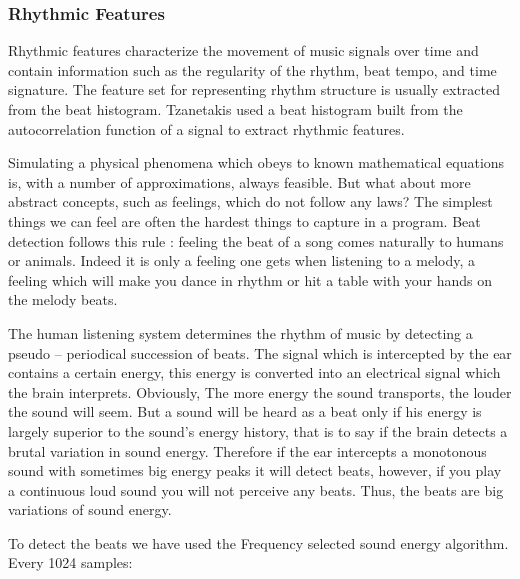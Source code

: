 \subsubsection{Rhythmic Features}
Rhythmic features characterize the movement of music signals over time and contain information such as the regularity of the rhythm, beat tempo, and time signature. The
feature set for representing rhythm structure is usually extracted from the beat histogram. Tzanetakis \cite{Tzanetakis2002} used a beat histogram built from the autocorrelation
function of a signal to extract rhythmic features.
\par Simulating a physical phenomena which obeys to known mathematical equations is, with a number of approximations, always feasible. But what about
more abstract concepts, such as feelings, which do not follow any laws? The simplest things we can feel are often the hardest things to capture in a
program. Beat detection follows this rule : feeling the beat of a song comes naturally to humans or animals. Indeed it is only a feeling one gets when
listening to a melody, a feeling which will make you dance in rhythm or hit a table with your hands on the melody beats. 
\par The human listening system determines the rhythm of music by detecting a pseudo – periodical succession of beats. The
signal which is intercepted by the ear contains a certain energy, this energy is converted into an electrical signal which the brain interprets.
Obviously, The more energy the sound transports, the louder the sound will seem. But a sound will be heard as a beat only if his energy is largely
superior to the sound's energy history, that is to say if the brain detects a brutal variation in sound energy. Therefore if the ear intercepts a
monotonous sound with sometimes big energy peaks it will detect beats, however, if you play a continuous loud sound you will not perceive any
beats. Thus, the beats are big variations of sound energy.
\par To detect the beats we have used the Frequency selected sound energy algorithm.\\
Every 1024 samples:
